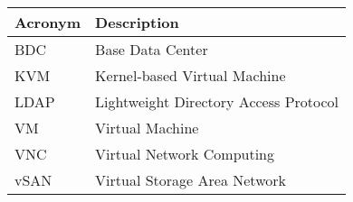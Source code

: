 \addtocounter{table}{-1}
\begin{longtable}{p{}p{}}\hline
\textbf{Acronym} & \textbf{Description}  \\\hline

BDC & Base Data Center \\\hline
KVM & Kernel-based Virtual Machine \\\hline
LDAP & Lightweight Directory Access Protocol \\\hline
VM & Virtual Machine \\\hline
VNC & Virtual Network Computing \\\hline
vSAN & Virtual Storage Area Network \\\hline
\end{longtable}
